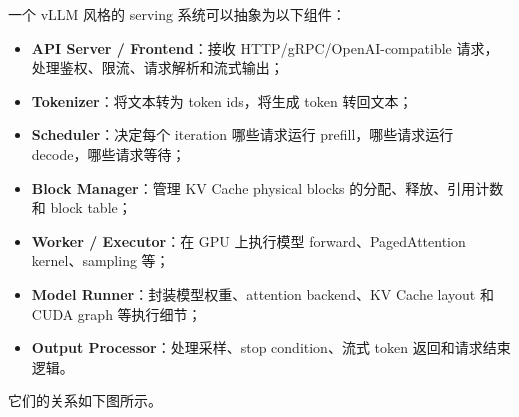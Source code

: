 一个 vLLM 风格的 serving 系统可以抽象为以下组件：

\begin{itemize}
\item \textbf{API Server / Frontend}：接收 HTTP/gRPC/OpenAI-compatible 请求，处理鉴权、限流、请求解析和流式输出；
\item \textbf{Tokenizer}：将文本转为 token ids，将生成 token 转回文本；
\item \textbf{Scheduler}：决定每个 iteration 哪些请求运行 prefill，哪些请求运行 decode，哪些请求等待；
\item \textbf{Block Manager}：管理 KV Cache physical blocks 的分配、释放、引用计数和 block table；
\item \textbf{Worker / Executor}：在 GPU 上执行模型 forward、PagedAttention kernel、sampling 等；
\item \textbf{Model Runner}：封装模型权重、attention backend、KV Cache layout 和 CUDA graph 等执行细节；
\item \textbf{Output Processor}：处理采样、stop condition、流式 token 返回和请求结束逻辑。
\end{itemize}

它们的关系如下图所示。

